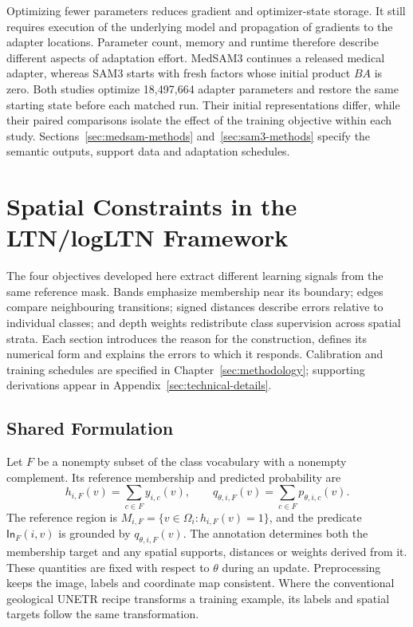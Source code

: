 \documentclass[12pt,a4paper]{article}
\begin{document}
Optimizing fewer parameters reduces gradient and optimizer-state storage.
It still requires execution of the underlying model and propagation of
gradients to the adapter locations. Parameter count, memory and runtime
therefore describe different aspects of adaptation effort. MedSAM3
continues a released medical adapter, whereas SAM3 starts with fresh
factors whose initial product $BA$ is zero. Both studies optimize
18,497,664 adapter parameters and restore the same starting state before
each matched run. Their initial representations differ, while their
paired comparisons isolate the effect of the training objective within
each study. Sections~\ref{sec:medsam-methods} and~\ref{sec:sam3-methods}
specify the semantic outputs, support data and adaptation schedules.

\clearpage
\section{Spatial Constraints in the LTN/logLTN Framework}
\label{sec:spatial-constraints}

The four objectives developed here extract different learning signals from
the same reference mask. Bands emphasize membership near its boundary;
edges compare neighbouring transitions; signed distances describe errors
relative to individual classes; and depth weights redistribute class
supervision across spatial strata. Each section introduces the reason
for the construction, defines its numerical form and explains the errors
to which it responds. Calibration and training schedules are specified
in Chapter~\ref{sec:methodology}; supporting derivations appear in
Appendix~\ref{sec:technical-details}.

\subsection{Shared Formulation}\label{sec:constraint-formulation}

Let $F$ be a nonempty subset of the class vocabulary with a nonempty
complement. Its reference membership and predicted probability are
\begin{equation}
h_{i,F}(v)=\sum_{c\in F}y_{i,c}(v),
\qquad
q_{\theta,i,F}(v)=\sum_{c\in F}p_{\theta,i,c}(v).
\label{eq:constraint-group-membership}
\end{equation}
The reference region is $M_{i,F}=\{v\in\Omega_i:h_{i,F}(v)=1\}$,
and the predicate $\mathsf{In}_F(i,v)$ is grounded by
$q_{\theta,i,F}(v)$. The annotation determines both the membership
target and any spatial supports, distances or weights derived from it.
These quantities are fixed with respect to $\theta$ during an update.
Preprocessing keeps the image, labels and coordinate map consistent.
Where the conventional geological UNETR recipe transforms a training
example, its labels and spatial targets follow the same transformation.
\end{document}
